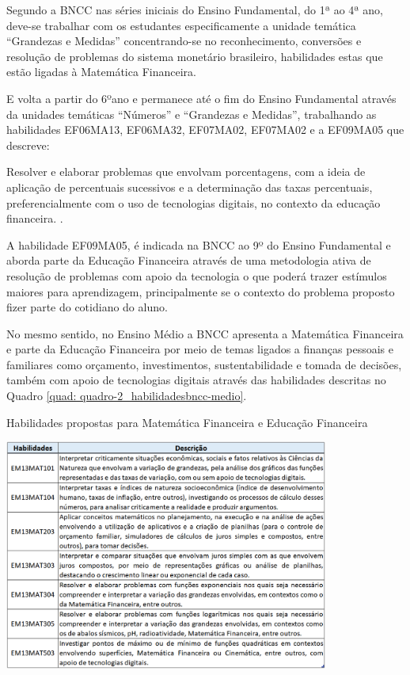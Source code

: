 Segundo a BNCC nas séries iniciais do Ensino Fundamental, do 1ª ao 4ª ano, deve-se trabalhar com os estudantes especificamente a unidade temática “Grandezas e Medidas” concentrando-se no reconhecimento, conversões e resolução de problemas do sistema monetário brasileiro, habilidades estas que estão ligadas à Matemática Financeira.

E volta a partir do 6ºano e permanece até o fim do Ensino Fundamental através da unidades temáticas “Números” e “Grandezas e Medidas”, trabalhando as habilidades EF06MA13, EF06MA32, EF07MA02, EF07MA02 e a EF09MA05 que descreve:

\begin{citacao}
Resolver e elaborar problemas que envolvam porcentagens, com a ideia de aplicação de percentuais sucessivos e a determinação das taxas percentuais, preferencialmente com o uso de tecnologias digitais, no contexto da educação financeira. \cite{brasil2017c}.
\end{citacao}

A habilidade EF09MA05, é indicada na BNCC ao 9º do Ensino Fundamental e aborda parte da Educação Financeira através de uma metodologia ativa de resolução de problemas com apoio da tecnologia o que poderá trazer estímulos maiores para aprendizagem, principalmente se o contexto do problema proposto fizer parte do cotidiano do aluno.

No mesmo sentido, no Ensino Médio a BNCC apresenta a Matemática Financeira e parte da Educação Financeira por meio de temas ligados a finanças pessoais e familiares como orçamento, investimentos, sustentabilidade e tomada de decisões, também com apoio de tecnologias digitais através das habilidades descritas no Quadro \ref{quad: quadro-2_habilidadesbncc-medio}.

\graphicspath{{quadros/}}
\begin{quadro}[!ht]
\centering
\begin{minipage}{1.\textwidth}
\caption{Habilidades propostas para Matemática Financeira e Educação Financeira}
\centering
\includegraphics[width=0.8\textwidth]{quadro-2_habilidades.png}
\label{quad: quadro-2_habilidadesbncc-medio}
\end{minipage}
\end{quadro}

